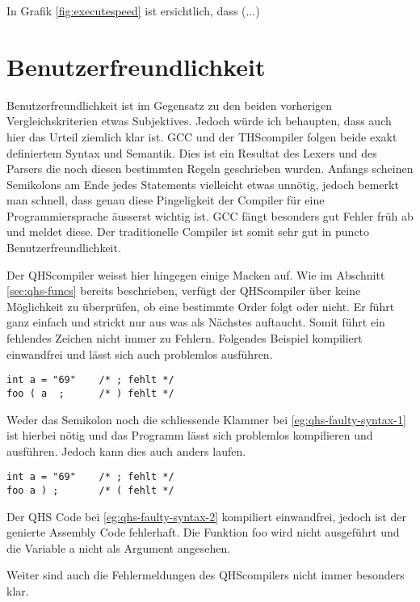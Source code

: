 In Grafik \ref{fig:executespeed} ist ersichtlich, dass (...)


\section{Benutzerfreundlichkeit}
Benutzerfreundlichkeit ist im Gegensatz zu den beiden vorherigen Vergleichskriterien etwas Subjektives. Jedoch würde ich behaupten, dass auch hier das Urteil ziemlich klar ist.
GCC und der THScompiler folgen beide exakt definiertem Syntax und Semantik. Dies ist ein Resultat des Lexers und des Parsers die noch diesen bestimmten Regeln geschrieben wurden.
Anfangs scheinen Semikolons am Ende jedes Statements vielleicht etwas unnötig, jedoch bemerkt man schnell, dass genau diese Pingeligkeit der Compiler für eine Programmiersprache äusserst wichtig ist.
GCC fängt besonders gut Fehler früh ab und meldet diese. Der traditionelle Compiler ist somit sehr gut in puncto Benutzerfreundlichkeit.

Der QHScompiler weisst hier hingegen einige Macken auf. Wie im Abschnitt \ref{sec:qhs-funcs} bereits beschrieben, verfügt der QHScompiler über keine Möglichkeit zu überprüfen, ob eine bestimmte Order folgt oder nicht.
Er führt ganz einfach und strickt nur aus was als Nächstes auftaucht. Somit führt ein fehlendes Zeichen nicht immer zu Fehlern. Folgendes Beispiel kompiliert einwandfrei und lässt sich auch problemlos ausführen.

\begin{lstlisting}[language=QHS, caption=QHS mit fehlenden Tokens, label=eg:qhs-faulty-syntax-1]
int a = "69"    /* ; fehlt */
foo ( a  ;      /* ) fehlt */
\end{lstlisting}

Weder das Semikolon noch die schliessende Klammer bei \ref{eg:qhs-faulty-syntax-1} ist hierbei nötig und das Programm lässt sich problemlos kompilieren und ausführen. Jedoch kann dies auch anders laufen.

\begin{lstlisting}[language=QHS, caption=QHS mit fehlender (, label=eg:qhs-faulty-syntax-2]
int a = "69"    /* ; fehlt */
foo a ) ;       /* ( fehlt */
\end{lstlisting}

Der QHS Code bei \ref{eg:qhs-faulty-syntax-2} kompiliert einwandfrei, jedoch ist der genierte Assembly Code fehlerhaft. Die Funktion foo wird nicht ausgeführt und die Variable a nicht als Argument angesehen.

Weiter sind auch die Fehlermeldungen des QHScompilers nicht immer besonders klar.


